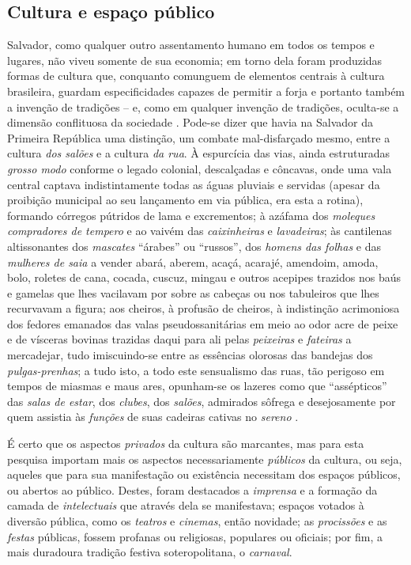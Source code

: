 \subsection{Cultura e espaço público}\label{subsec:cultespubsaba}

Salvador, como qualquer outro assentamento humano em todos os tempos e lugares, não viveu somente de sua economia; em torno dela foram produzidas formas de cultura que, conquanto comunguem de elementos centrais à cultura brasileira, guardam especificidades capazes de permitir a forja e portanto também a invenção de tradições -- e, como em qualquer invenção de tradições, oculta-se a dimensão conflituosa da sociedade \cite{mariano_baianidade_2009,pinho_baianidade_1998}. Pode-se dizer que havia na Salvador da Primeira República uma distinção, um combate mal-disfarçado mesmo, entre a cultura \textit{dos salões} e a cultura \textit{da rua}. À espurcícia das vias, ainda estruturadas \textit{grosso modo} conforme o legado colonial, descalçadas e côncavas, onde uma vala central captava indistintamente todas as águas pluviais e servidas (apesar da proibição municipal ao seu lançamento em via pública, era esta a rotina), formando córregos pútridos de lama e excrementos; à azáfama dos \textit{moleques compradores de tempero} e ao vaivém das \textit{caixinheiras} e \textit{lavadeiras}; às cantilenas altissonantes dos \textit{mascates} ``árabes'' ou ``russos'', dos \textit{homens das folhas} e das \textit{mulheres de saia} a vender abará, aberem, acaçá, acarajé, amendoim, amoda, bolo, roletes de cana, cocada, cuscuz, mingau e outros acepipes trazidos nos baús e gamelas que lhes vacilavam por sobre as cabeças ou nos tabuleiros que lhes recurvavam a figura; aos cheiros, à profusão de cheiros, à indistinção acrimoniosa dos fedores emanados das valas pseudossanitárias em meio ao odor acre de peixe e de vísceras bovinas trazidas daqui para ali pelas \textit{peixeiras} e \textit{fateiras} a mercadejar, tudo imiscuindo-se entre as essências  olorosas das bandejas dos \textit{pulgas-prenhas}; a tudo isto, a todo este sensualismo das ruas, tão perigoso em tempos de miasmas e maus ares, opunham-se os lazeres como que ``assépticos'' das \textit{salas de estar}, dos \textit{clubes}, dos \textit{salões}, admirados sôfrega e desejosamente por quem assistia às \textit{funções} de suas cadeiras cativas no \textit{sereno} \cite{vianna_bahia_1973}.

É certo que os aspectos \textit{privados} da cultura são marcantes, mas para esta pesquisa importam mais os aspectos necessariamente \textit{públicos} da cultura, ou seja, aqueles que para sua manifestação ou existência necessitam dos espaços públicos, ou abertos ao público. Destes, foram destacados a \textit{imprensa} e a formação da camada de \textit{intelectuais} que através dela se manifestava; espaços votados à diversão pública, como os \textit{teatros} e \textit{cinemas}, então novidade; as \textit{procissões} e as \textit{festas} públicas, fossem profanas ou religiosas, populares ou oficiais; por fim, a mais duradoura tradição festiva soteropolitana, o \textit{carnaval}.

